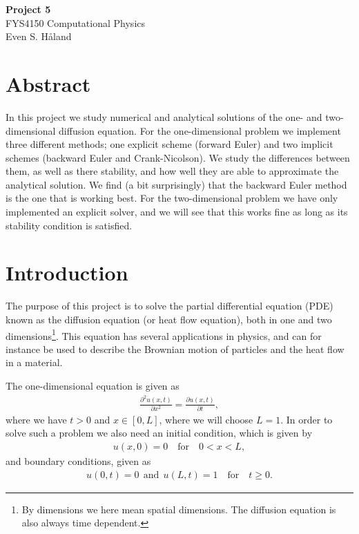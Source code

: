\documentclass[12pt, a4paper]{article}
\begin{document}
\begin{titlepage}
\begin{center}
\vspace*{3cm}
\Huge
\textbf{Project 5} \\
\Large  
FYS4150 Computational Physics 
\vspace*{3cm} \\ 

Even S. Håland 
\vspace*{5cm} \\

\normalsize
\section*{Abstract}

In this project we study numerical and analytical solutions of the one- and two-dimensional diffusion 
equation. For the one-dimensional problem we implement three different methods; one explicit scheme 
(forward Euler) and two implicit schemes (backward Euler and Crank-Nicolson). We study the differences 
between them, as well as there stability, and how well they are able to approximate the analytical 
solution. We find (a bit surprisingly) that the backward Euler method is the one that is working best. 
For the two-dimensional problem we have only implemented an explicit solver, and we will see that this 
works fine as long as its stability condition is satisfied. 

\end{center}
\end{titlepage}

\section{Introduction}

The purpose of this project is to solve the partial differential equation (PDE) known as the 
diffusion equation (or heat flow equation), both in one and two dimensions\footnote{By  
dimensions we here mean spatial dimensions. The diffusion equation is also always time dependent.}. 
This equation has several applications in physics, and can for instance be used to describe the 
Brownian motion of particles and the heat flow in a material.   

The one-dimensional equation is given as 
\begin{align}
\frac{\partial ^2 u(x,t)}{\partial x^2} = \frac{\partial u(x,t)}{\partial t}, 
\label{eq:1d}
\end{align} 
where we have $t>0$ and $x\in [0,L]$, where we will choose $L=1$. In order to solve such a problem we 
also need an initial condition, which is given by 
\begin{align*}
u(x,0) = 0 \quad \text{for}  \quad 0<x<L, 
\end{align*} 
and boundary conditions, given as 
\begin{align*}
u(0,t) = 0 \:\: \text{and} \:\: u(L,t)=1 \quad \text{for} \quad t\geq 0.  
\end{align*}
\end{document}
